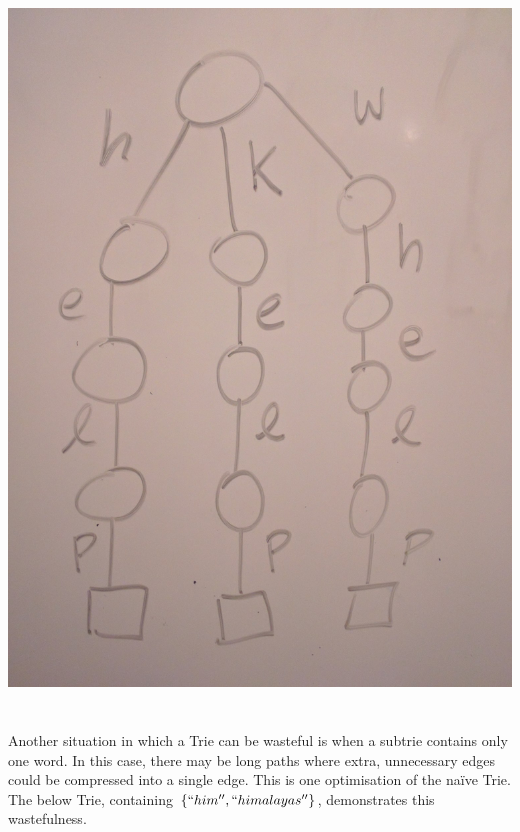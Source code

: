 \documentclass[a4paper,12pt]{article}
\begin{document}
~\\~\\
\includegraphics[scale=0.1]{fig_worstcase}
~\\~\\

\noindent
Another situation in which a Trie can be wasteful is when a subtrie contains only one word. In this case, there may be long paths where extra, unnecessary edges could be compressed into a single edge. This is one optimisation of the naïve Trie. The below Trie, containing $\{ ``him'', ``himalayas'' \}$, demonstrates this wastefulness.
\end{document}

